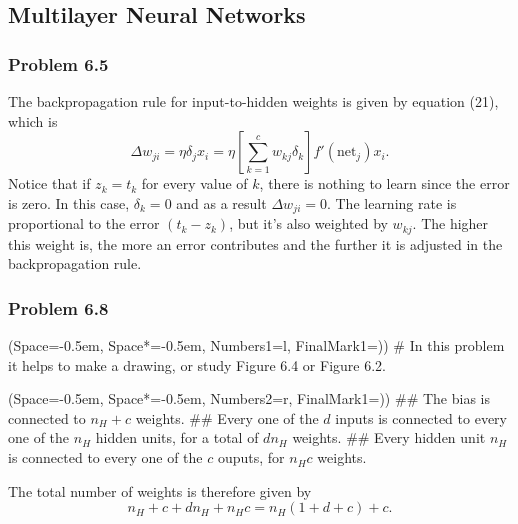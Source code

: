 \documentclass[12pt, a4paper]{article}
\newcommand{\listSpace}{-0.5em}%
\begin{document}
{\clearpage
\subsection{Multilayer Neural Networks}

\subsubsection*{Problem 6.5}
The backpropagation rule for input-to-hidden weights is given by equation (21), which is
\begin{equation*}
	\Delta w_{ji} =
	\eta \delta_j x_i = 
	\eta \left[ \sum_{k=1}^{c} w_{kj} \delta_k \right] f'(\text{net}_j) x_i.
\end{equation*}
Notice that if $z_k = t_k$ for every value of $k$, there is nothing to learn since the error is zero.
In this case, $\delta_k = 0$ and as a result $\Delta w_{ji} = 0$.
The learning rate is proportional to the error $(t_k - z_k)$, but it's also weighted by $w_{kj}$.
The higher this weight is, the more an error contributes and the further it is adjusted in the backpropagation rule.



\subsubsection*{Problem 6.8}
\begin{easylist}[enumerate]
\ListProperties(Space=\listSpace, Space*=\listSpace, Numbers1=l, FinalMark1={)})
# In this problem it helps to make a drawing, or study Figure 6.4 or Figure 6.2.

\begin{easylist}
	\ListProperties(Space=\listSpace, Space*=\listSpace, Numbers2=r, FinalMark1={)})
## The bias is connected to $n_H + c$ weights.
## Every one of the $d$ inputs is connected to every one of the $n_H$ hidden units, for a total of $d n_H$ weights.
## Every hidden unit $n_H$ is connected to every one of the $c$ ouputs, for $n_H c$ weights. 
\end{easylist}



The total number of weights is therefore given by
\begin{equation*}
	n_H + c + d n_H  +n_H c = n_H (1 + d + c) + c.
\end{equation*}


\end{easylist}}
\end{document}
